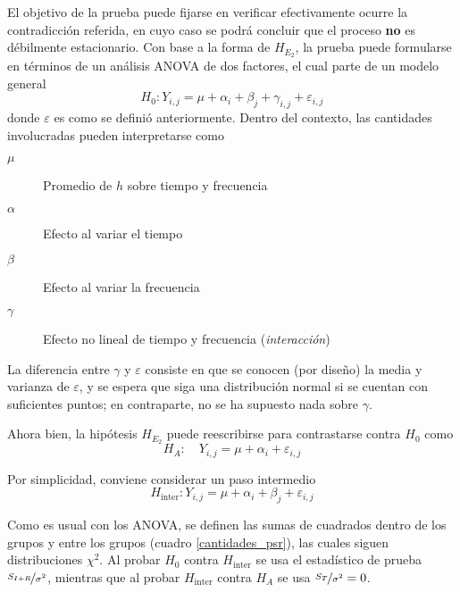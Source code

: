 El objetivo de la prueba puede fijarse en verificar efectivamente ocurre la contradicción
referida, en cuyo caso se podrá concluir que el proceso \textbf{no} es débilmente estacionario.
%
Con base a la forma de $H_{E_2}$, la prueba puede formularse en términos de un análisis ANOVA de dos
factores, el cual parte de un modelo general
%
\begin{equation*}
H_0 : Y_{i,j} = \mu + \alpha_i + \beta_j + \gamma_{i,j} + \varepsilon_{i,j}
\end{equation*}
%
donde $\varepsilon$ es como se definió anteriormente. 
%
Dentro del contexto, las cantidades involucradas pueden interpretarse como
\begin{description}
\item[$\mu$] Promedio de $h$ sobre tiempo y frecuencia
\item[$\alpha$] Efecto al variar el tiempo
\item[$\beta$] Efecto al variar la frecuencia
\item[$\gamma$] Efecto no lineal de tiempo y frecuencia (\textit{interacción})
\end{description}

La diferencia entre $\gamma$ y $\varepsilon$ consiste en que se conocen (por diseño) la media y 
varianza de $\varepsilon$, y se espera que siga una distribución normal si se cuentan con 
suficientes puntos; en contraparte, no se ha supuesto nada sobre $\gamma$.

Ahora bien, la hipótesis $H_{E_2}$ puede reescribirse para contrastarse contra $H_0$ como
%
\begin{equation*}
H_A : \hspace{1em} Y_{i,j} = \mu + \alpha_i + \varepsilon_{i,j}
\end{equation*}

Por simplicidad, conviene considerar un paso intermedio
\begin{equation*}
H_{\text{inter}} : Y_{i,j} = \mu + \alpha_i + \beta_j + \varepsilon_{i,j}
\end{equation*}

Como es usual con los ANOVA, se definen las sumas de cuadrados dentro de los grupos y entre los
grupos (cuadro \ref{cantidades_psr}), las cuales siguen distribuciones $\chi^{2}$.
%
Al probar $H_0$ contra $H_{\text{inter}}$ se usa el estadístico de prueba 
$\nicefrac{S_{I+R}}{\sigma^{2}}$, mientras que al probar $H_{\text{inter}}$ contra $H_A$ se usa
$\nicefrac{S_T}{\sigma^{2}} = 0$.

